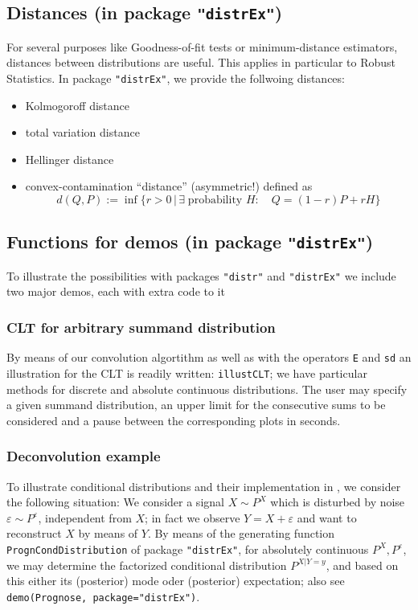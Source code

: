 \documentclass[11pt]{article}
\newcommand{\code}[1]{{\tt #1}}
\newcommand{\pkg}[1]{{\tt "#1"}}
\begin{document}
\subsection[Distances (in package distrEx)]{Distances (in package \pkg{distrEx})}\label{Distances}
%
For several purposes like Goodness-of-fit tests or minimum-distance estimators, distances between distributions
are useful. This applies in particular to Robust Statistics. In package \pkg{distrEx}, we provide the follwoing distances:
\begin{itemize}
  \item Kolmogoroff distance
  \item total variation distance
  \item Hellinger distance
  \item convex-contamination ``distance'' (asymmetric!) defined as
  $$
d(Q,P):=\inf\{r>0\,|\, \exists \;\mbox{probability } H:\quad Q=(1-r)P+rH \}
  $$
\end{itemize}
\subsection[Functions for demos (in package distrEx)]{Functions for demos (in package \pkg{distrEx})}\label{Demos}
%
To illustrate the possibilities with packages \pkg{distr} and \pkg{distrEx} we include two major demos, each with
extra code to it

\subsubsection{CLT for arbitrary summand distribution}

By means of our convolution algortithm as well as with the operators \code{E} and \code{sd} an illustration for
the CLT is readily written: \code{illustCLT}; we have particular methods for discrete and absolute continuous distributions.
The user may specify a given summand  distribution, an upper limit for the consecutive sums to be considered and a pause
between the corresponding plots in seconds.

\subsubsection{Deconvolution example}

To illustrate conditional distributions and their implementation in \linebreak[4]\pkg{distrEx}, we consider the following situation:
We consider a signal $X\sim P^X$ which is disturbed by noise $\varepsilon\sim P^\varepsilon$, independent from $X$; in fact we observe
$Y=X+\varepsilon$ and want to reconstruct $X$ by means of $Y$. By means of the generating function \code{PrognCondDistribution}
of package \pkg{distrEx}, for absolutely continuous $P^X, P^\varepsilon$, we may determine the factorized conditional
distribution $P^{X|Y=y}$, and based on this either its (posterior) mode oder (posterior) expectation; also see
\code{demo(Prognose, package="distrEx")}.
\end{document}

